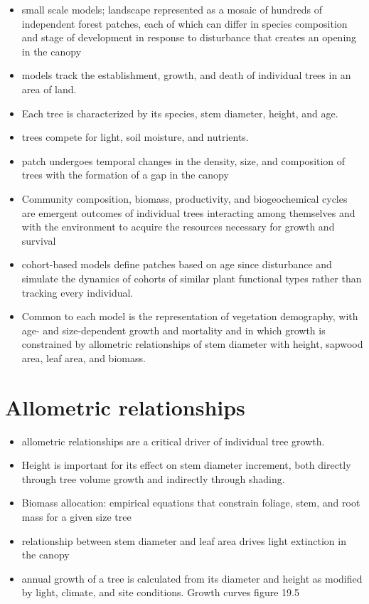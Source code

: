 \documentclass[
  oneside]{book}
\providecommand{\tightlist}{%
  \setlength{\itemsep}{0pt}\setlength{\parskip}{0pt}}
\begin{document}
\begin{itemize}
\item
  small scale models; landscape represented as a mosaic of hundreds of independent forest patches, each of which can differ in species composition and stage of development in response to disturbance that creates an opening in the canopy
\item
  models track the establishment, growth, and death of individual trees in an area of land.
\item
  Each tree is characterized by its species, stem diameter, height, and age.
\item
  trees compete for light, soil moisture, and nutrients.
\item
  patch undergoes temporal changes in the density, size, and composition of trees with the formation of a gap in the canopy
\item
  Community composition, biomass, productivity, and biogeochemical cycles are emergent outcomes of individual trees interacting among themselves and with the environment to acquire the resources necessary for growth and survival
\item
  cohort-based models define patches based on age since disturbance and simulate the dynamics of cohorts of similar plant functional types rather than tracking every individual.
\item
  Common to each model is the representation of vegetation demography, with age- and size-dependent growth and mortality and in which growth is constrained by allometric relationships of stem diameter with height, sapwood area, leaf area, and biomass.
\end{itemize}

\hypertarget{allometric-relationships}{%
\section{Allometric relationships}\label{allometric-relationships}}

\begin{itemize}
\tightlist
\item
  allometric relationships are a critical driver of individual tree growth.
\item
  Height is important for its effect on stem diameter increment, both directly through tree volume growth and indirectly through shading.
\item
  Biomass allocation: empirical equations that constrain foliage, stem, and root mass for a given size tree
\item
  relationship between stem diameter and leaf area drives light extinction in the canopy
\item
  annual growth of a tree is calculated from its diameter and height as modified by light, climate, and site conditions. Growth curves figure 19.5
\end{itemize}
\end{document}
